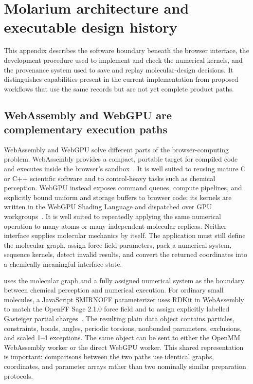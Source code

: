 \section{Molarium architecture and executable design history}
\label{app:architecture}

This appendix describes the software boundary beneath the browser interface,
the development procedure used to implement and check the numerical kernels,
and the provenance system used to save and replay molecular-design decisions.
It distinguishes capabilities present in the current implementation from
proposed workflows that use the same records but are not yet complete product
paths.

\subsection{WebAssembly and WebGPU are complementary execution paths}
\label{app:wasm-webgpu}

WebAssembly and WebGPU solve different parts of the browser-computing problem.
WebAssembly provides a compact, portable target for compiled code and executes
inside the browser's sandbox~\cite{haas2017webassembly}.
It is well suited to reusing mature C or C++ scientific software and to
control-heavy tasks such as chemical perception.
WebGPU instead exposes command queues, compute pipelines, and explicitly bound
uniform and storage buffers to browser code; its kernels are written in the
WebGPU Shading Language and dispatched over GPU workgroups~\cite{w3c2025webgpu,w3c2026wgsl}.
It is well suited to repeatedly applying the same numerical operation to many
atoms or many independent molecular replicas.
Neither interface supplies molecular mechanics by itself.
The application must still define the molecular graph, assign force-field
parameters, pack a numerical system, sequence kernels, detect invalid results,
and convert the returned coordinates into a chemically meaningful interface
state.

\molarium{} uses the molecular graph and a fully assigned numerical system as
the boundary between chemical perception and numerical execution.
For ordinary small molecules, a JavaScript SMIRNOFF parameterizer uses RDKit in
WebAssembly to match the OpenFF Sage 2.1.0 force field and to assign explicitly
labelled Gasteiger partial charges~\cite{boothroyd2023sage,gasteiger1980charges}.
The resulting plain data object contains particles, constraints, bonds, angles,
periodic torsions, nonbonded parameters, exclusions, and scaled 1--4
exceptions.
The same object can be sent to either the OpenMM WebAssembly worker or the
direct WebGPU worker.
This shared representation is important: comparisons between the two paths use
identical graphs, coordinates, and parameter arrays rather than two nominally
similar preparation protocols.

